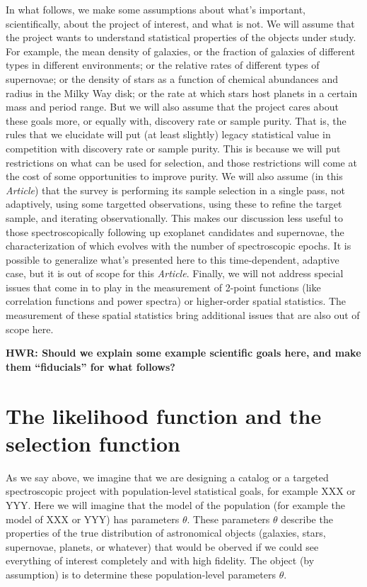 \documentclass[modern]{aastex62}
\newcommand{\documentname}{\textsl{Article}}
\begin{document}
In what follows, we make some assumptions about what's important,
scientifically, about the project of interest, and what is not.
We will assume that the project wants to understand statistical properties
of the objects under study.
For example, the mean density of galaxies, or the fraction of galaxies
of different types in different environments;
or the relative rates of different types of supernovae;
or the density of stars as a function of chemical abundances and radius in the Milky Way disk;
or the rate at which stars host planets in a certain mass and period range.
But we will also assume that the project cares about these goals more,
or equally with, discovery rate or sample purity.
That is, the rules that we elucidate will put (at least slightly)
legacy statistical value in competition with discovery rate or sample
purity.
This is because we will put restrictions on what can be used for
selection, and those restrictions will come at the cost of some
opportunities to improve purity.
We will also assume (in this \documentname) that the survey is performing
its sample selection in a single pass, not adaptively, using some
targetted observations, using these to refine the target sample, and
iterating observationally.
This makes our discussion less useful to those spectroscopically following up exoplanet
candidates and supernovae, the characterization of which evolves with
the number of spectroscopic epochs.
It is possible to generalize what's presented here to this time-dependent, adaptive
case, but it is out of scope for this \documentname.
Finally, we will not address special issues that come in to play in the
measurement of 2-point functions (like correlation functions and power
spectra) or higher-order spatial statistics.
The measurement of these spatial statistics bring additional issues
that are also out of scope here.

\textbf{HWR: Should we explain some example scientific goals here, and make
them ``fiducials'' for what follows?}

\section{The likelihood function and the selection function}

As we say above, we imagine that we are designing a catalog or a targeted
spectroscopic project
with population-level statistical goals, for example XXX or YYY.
Here we will imagine that the model of the population (for example the model
of XXX or YYY) has parameters $\theta$.
These parameters $\theta$ describe the properties of the true distribution
of astronomical objects (galaxies, stars, supernovae, planets, or whatever)
that would be oberved if we could see everything of interest completely and
with high fidelity.
The object (by assumption) is to determine these population-level parameters
$\theta$.
\end{document}
